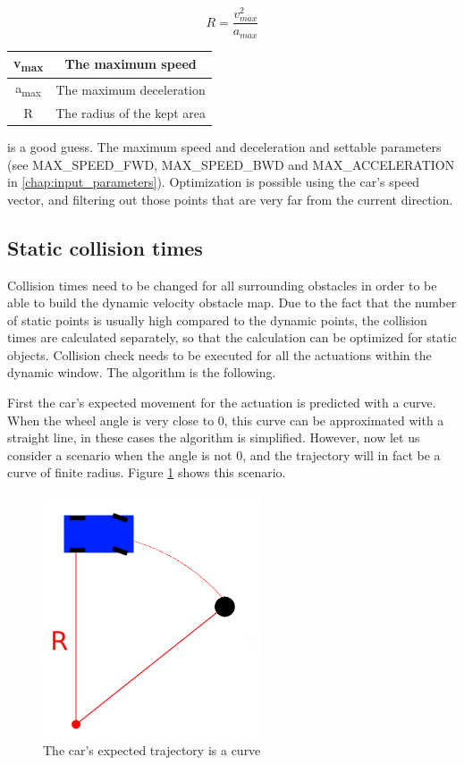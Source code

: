 \[ R = \frac{v_{max}^2}{a_{max}} \]

\begin{center}
    \begin{tabular}{ | c | c | }
        \hline
        v\textsubscript{max}	& The maximum speed   			\\
        \hline
        a\textsubscript{max}  	& The maximum deceleration      \\
        \hline
        R  						& The radius of the kept area	\\
        \hline
    \end{tabular}
\end{center}

is a good guess. The maximum speed and deceleration and settable parameters (see MAX\_SPEED\_FWD, MAX\_SPEED\_BWD and MAX\_ACCELERATION in \ref{chap:input_parameters}). Optimization is possible using the car's speed vector, and filtering out those points that are very far from the current direction.

\subsection{Static collision times}
Collision times need to be changed for all surrounding obstacles in order to be able to build the dynamic velocity obstacle map. Due to the fact that the number of static points is usually high compared to the dynamic points, the collision times are calculated separately, so that the calculation can be optimized for static objects. Collision check needs to be executed for all the actuations within the dynamic window. The algorithm is the following.

First the car's expected movement for the actuation is predicted with a curve. When the wheel angle is very close to 0, this curve can be approximated with a straight line, in these cases the algorithm is simplified. However, now let us consider a scenario when the angle is not 0, and the trajectory will in fact be a curve of finite radius. Figure \ref{static_collision_time_check_objects} shows this scenario.

\begin{figure}[!ht]
    \centering
    \includegraphics[height=72mm]{figures/raw/static_collision_time_check_objects.png}
    \caption{The car's expected trajectory is a curve}
    \label{static_collision_time_check_objects}
\end{figure}


